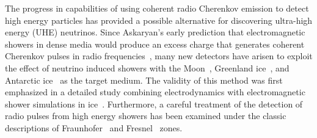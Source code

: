 \par The progress in capabilities of using coherent radio Cherenkov emission to detect high energy particles has provided a possible alternative for discovering ultra-high energy (UHE) neutrinos.  Since Askaryan's early prediction that electromagnetic showers in dense media would produce an excess charge that generates coherent Cherenkov pulses in radio frequencies~\cite{Askaryan.1962,Askaryan.1965}, many new detectors have arisen to exploit the effect of neutrino induced showers with the Moon~\cite{GLUE.2004}, Greenland ice~\cite{FORTE.2004}, and Antarctic ice~\cite{RICE.2003,AMANDA.2006,ANITA.2006} as the target medium.  The validity of this method was first emphasized in a detailed study combining electrodynamics with electromagnetic shower simulations in ice~\cite{Zas.1992}.  Furthermore, a careful treatment of the detection of radio pulses from high energy showers has been examined under the classic descriptions of Fraunhofer~\cite{Alvarez.2000} and Fresnel~\cite{Buniy.2001} zones.